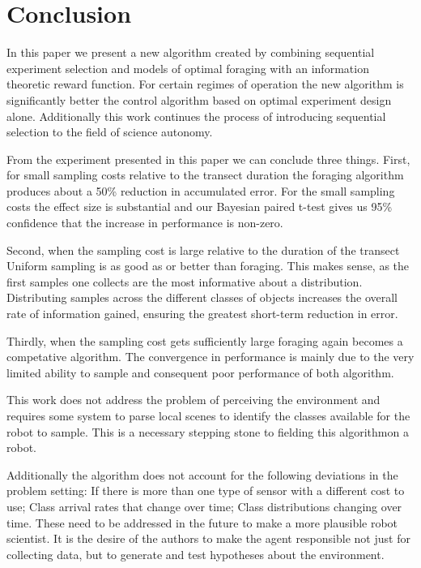 \section{Conclusion}
\label{sec:conclusion}

In this paper we present a new algorithm created by combining sequential experiment selection and models of optimal foraging with an information theoretic reward function.  For certain regimes of operation the new algorithm is significantly better the control algorithm based on optimal experiment design alone.  Additionally this work continues the process of introducing sequential selection to the field of science autonomy.  

From the experiment presented in this paper we can conclude three things.  First, for small sampling costs relative to the transect duration the foraging algorithm produces about a 50\% reduction in accumulated error.  For the small sampling costs the effect size is substantial and our Bayesian paired t-test gives us 95\% confidence that the increase in performance is non-zero.

Second, when the sampling cost is large relative to the duration of the transect Uniform sampling is as good as or better than foraging.  This makes sense, as the first samples one collects are the most informative about a distribution.  Distributing samples across the different classes of objects increases the overall rate of information gained, ensuring the greatest short-term reduction in error.

Thirdly, when the sampling cost gets sufficiently large foraging again becomes a competative algorithm.  The convergence in performance is mainly due to the very limited ability to sample and consequent poor performance of both algorithm.  

This work does not address the problem of perceiving the environment and requires some system to parse local scenes to identify the classes available for the robot to sample.  This is a necessary stepping stone to fielding this algorithmon a robot.

Additionally the algorithm does not account for the following deviations in the problem setting: If there is more than one type of sensor with a different cost to use; Class arrival rates that change over time; Class distributions changing over time.  These need to be addressed in the future to make a more plausible robot scientist.  It is the desire of the authors to make the agent responsible not just for collecting data, but to generate and test hypotheses about the environment.
% 
% 
% 
% 
% 




